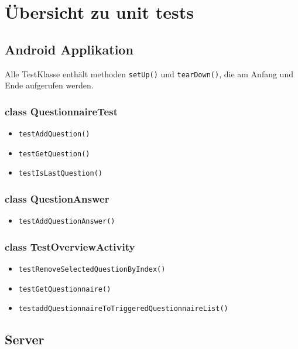 \documentclass[a4paper]{scrreprt}
\begin{document}
    \chapter{Übersicht zu unit tests}

        \section{Android Applikation}

            Alle TestKlasse enthält methoden \texttt{setUp()} und \texttt{tearDown()}, die am Anfang und Ende aufgerufen werden.

            \subsection{class QuestionnaireTest}
                \begin{itemize}
                    \item \texttt{testAddQuestion()}
                    \item \texttt{testGetQuestion()}
                    \item \texttt{testIsLastQuestion()}
                \end{itemize}

            \subsection{class QuestionAnswer}
                \begin{itemize}
                    \item \texttt{testAddQuestionAnswer()}
                \end{itemize}

            \subsection{class TestOverviewActivity}
                \begin{itemize}
                    \item \texttt{testRemoveSelectedQuestionByIndex()}
                    \item \texttt{testGetQuestionnaire()}
                    \item \texttt{testaddQuestionnaireToTriggeredQuestionnaireList()}
                \end{itemize}


        \section{Server}

    \newpage
\end{document}
